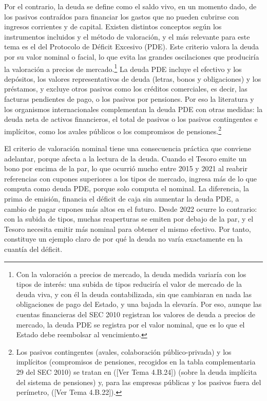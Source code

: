 \documentclass[10pt,a4paper]{article}
\newcommand{\authorfont}[1]{{\fontfamily{EBGaramond-TLF}\selectfont #1}}
\begin{document}
Por el contrario, la deuda se define como el saldo vivo, en un momento dado, de los pasivos contraídos para financiar los gastos que no pueden cubrirse con ingresos corrientes y de capital. Existen distintos conceptos según los instrumentos incluidos y el método de valoración, y el más relevante para este tema es el del Protocolo de Déficit Excesivo (PDE). Este criterio valora la deuda por su valor nominal o facial, lo que evita las grandes oscilaciones que produciría la valoración a precios de mercado.\footnote{%
    Con la valoración a precios de mercado, la deuda medida variaría con los tipos de interés: una subida de tipos reduciría el valor de mercado de la deuda viva, y con él la deuda contabilizada, sin que cambiaran en nada las obligaciones de pago del Estado, y una bajada la elevaría. Por eso, aunque las cuentas financieras del SEC 2010 registran los valores de deuda a precios de mercado, la deuda PDE se registra por el valor nominal, que es lo que el Estado debe reembolsar al vencimiento.
} La deuda PDE incluye el efectivo y los depósitos, los valores representativos de deuda (letras, bonos y obligaciones) y los préstamos, y excluye otros pasivos como los créditos comerciales, es decir, las facturas pendientes de pago, o los pasivos por pensiones. Por eso la literatura y los organismos internacionales complementan la deuda PDE con otras medidas: la deuda neta de activos financieros, el total de pasivos o los pasivos contingentes e implícitos, como los avales públicos o los compromisos de pensiones.\footnote{%
    Los pasivos contingentes (avales, colaboración público-privada) y los implícitos (compromisos de pensiones, recogidos en la tabla complementaria 29 del SEC 2010) se tratan en ([\authorfont{Ver Tema 4.B.24}]) (sobre la deuda implícita del sistema de pensiones) y, para las empresas públicas y los pasivos fuera del perímetro, ([\authorfont{Ver Tema 4.B.22}]).
}

El criterio de valoración nominal tiene una consecuencia práctica que conviene adelantar, porque afecta a la lectura de la deuda. Cuando el Tesoro emite un bono por encima de la par, lo que ocurrió mucho entre 2015 y 2021 al reabrir referencias con cupones superiores a los tipos de mercado, ingresa más de lo que computa como deuda PDE, porque solo computa el nominal. La diferencia, la prima de emisión, financia el déficit de caja sin aumentar la deuda PDE, a cambio de pagar cupones más altos en el futuro. Desde 2022 ocurre lo contrario: con la subida de tipos, muchas reaperturas se emiten por debajo de la par, y el Tesoro necesita emitir más nominal para obtener el mismo efectivo. Por tanto, constituye un ejemplo claro de por qué la deuda no varía exactamente en la cuantía del déficit.
\end{document}
